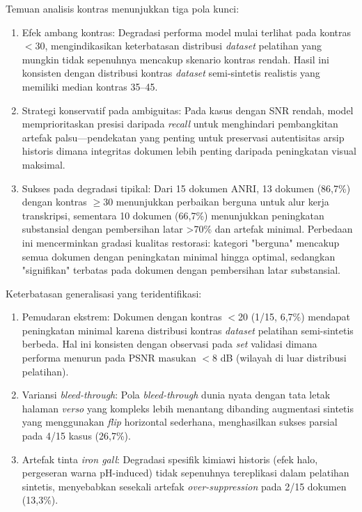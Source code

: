 \documentclass[journal]{IEEEtran}
\begin{document}
Temuan analisis kontras menunjukkan tiga pola kunci:
\begin{enumerate}
    \item Efek ambang kontras: Degradasi performa model mulai terlihat pada kontras $<$30, mengindikasikan keterbatasan distribusi \textit{dataset} pelatihan yang mungkin tidak sepenuhnya mencakup skenario kontras rendah. Hasil ini konsisten dengan distribusi kontras \textit{dataset} semi-sintetis realistis yang memiliki median kontras 35--45.
    
    \item Strategi konservatif pada ambiguitas: Pada kasus dengan SNR rendah, model memprioritaskan presisi daripada \textit{recall} untuk menghindari pembangkitan artefak palsu---pendekatan yang penting untuk preservasi autentisitas arsip historis dimana integritas dokumen lebih penting daripada peningkatan visual maksimal.
    
    \item Sukses pada degradasi tipikal: Dari 15 dokumen ANRI, 13 dokumen (86,7\%) dengan kontras $\geq$30 menunjukkan perbaikan berguna untuk alur kerja transkripsi, sementara 10 dokumen (66,7\%) menunjukkan peningkatan substansial dengan pembersihan latar >70\% dan artefak minimal. Perbedaan ini mencerminkan gradasi kualitas restorasi: kategori "berguna" mencakup semua dokumen dengan peningkatan minimal hingga optimal, sedangkan "signifikan" terbatas pada dokumen dengan pembersihan latar substansial.
\end{enumerate}

Keterbatasan generalisasi yang teridentifikasi:
\begin{enumerate}
    \item Pemudaran ekstrem: Dokumen dengan kontras $<$20 (1/15, 6,7\%) mendapat peningkatan minimal karena distribusi kontras \textit{dataset} pelatihan semi-sintetis berbeda. Hal ini konsisten dengan observasi pada \textit{set} validasi dimana performa menurun pada PSNR masukan $<$8 dB (wilayah di luar distribusi pelatihan).
    
    \item Variansi \textit{bleed-through}: Pola \textit{bleed-through} dunia nyata dengan tata letak halaman \textit{verso} yang kompleks lebih menantang dibanding augmentasi sintetis yang menggunakan \textit{flip} horizontal sederhana, menghasilkan sukses parsial pada 4/15 kasus (26,7\%).
    
    \item Artefak tinta \textit{iron gall}: Degradasi spesifik kimiawi historis (efek halo, pergeseran warna pH-induced) tidak sepenuhnya tereplikasi dalam pelatihan sintetis, menyebabkan sesekali artefak \textit{over-suppression} pada 2/15 dokumen (13,3\%).
\end{enumerate}
\end{document}
